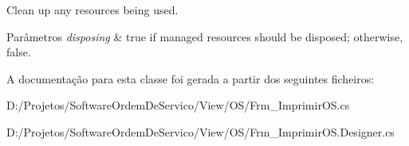 Clean up any resources being used. 


\begin{DoxyParams}{Parâmetros}
{\em disposing} & true if managed resources should be disposed; otherwise, false.\\
\hline
\end{DoxyParams}


A documentação para esta classe foi gerada a partir dos seguintes ficheiros\+:\begin{DoxyCompactItemize}
\item 
D\+:/\+Projetos/\+Software\+Ordem\+De\+Servico/\+View/\+O\+S/Frm\+\_\+\+Imprimir\+O\+S.\+cs\item 
D\+:/\+Projetos/\+Software\+Ordem\+De\+Servico/\+View/\+O\+S/Frm\+\_\+\+Imprimir\+O\+S.\+Designer.\+cs\end{DoxyCompactItemize}
